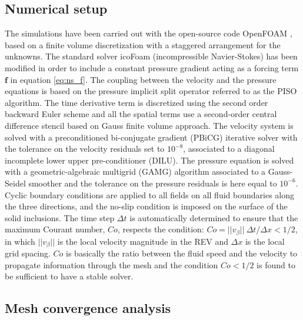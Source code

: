 
\subsection{Numerical setup}
\label{ph:numeric_setup}



The simulations have been carried out with the open-source code OpenFOAM \citet{openfoam}, based on  a finite volume discretization with a staggered arrangement for the unknowns.
The standard solver icoFoam (incompressible Navier-Stokes) has been modified in order to include a constant pressure gradient acting as a forcing term $\mathbf{f}$  in equation \eqref{eq:ns_f}. 
The coupling between  the velocity and the pressure equations is based on the pressure implicit split operator referred to as the PISO algorithm. 
The time derivative term is discretized using the second order backward Euler scheme and all the spatial terms use a second-order central difference stencil  based on Gauss finite volume approach. The velocity system is solved with a preconditioned bi-conjugate gradient (PBiCG) iterative solver with the tolerance on the velocity residuals set to $10^{-8}$, associated to a   diagonal incomplete lower upper pre-conditioner (DILU).
The pressure equation is solved with a geometric-algebraic multigrid (GAMG) algorithm associated to a Gauss-Seidel smoother and the tolerance on the pressure residuals is here equal to $10^{-6}$.  Cyclic boundary conditions are applied to all fields on all fluid
boundaries along the three directions, and the no-slip condition is imposed on the surface of the solid inclusions. 
The time step $\Delta t$  is automatically determined to ensure  that the maximum Courant number, $Co$, respects the condition:
$Co =  ||v_\beta||  \ \Delta t / \Delta x < 1/2 $, in which $||v_\beta||$ is the local velocity magnitude in the REV and $\Delta x$ is the local grid spacing. $Co$ 
is basically the ratio between the fluid speed  and the velocity to propagate information through the mesh and the condition $Co < 1/2$ is found to be sufficient to have a stable solver.




\subsection{Mesh convergence analysis }

